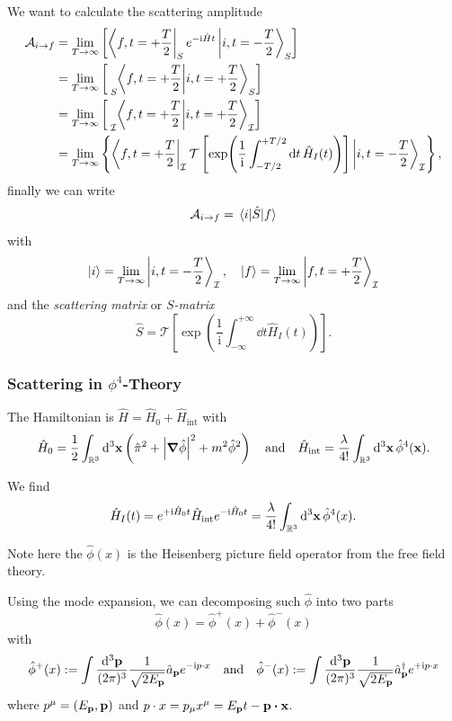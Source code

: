 \documentclass[a4paper,11pt]{article}
\begin{document}
	We want to calculate the scattering amplitude
	\begin{align*}
		\mathcal{A}_{i \to f} & = \lim _{T \to \infty} \left[\bra{f, t = + \frac{T}{2}}_S e ^{-\mathrm{i}\hat H t} \ket{i, t = - \frac{T}{2}}_S \right]\\
		& = \lim _{T \to \infty} \left[\tensor[_S]{\braket{f, t = + \frac{T}{2}}{i, t = + \frac{T}{2}}}{_S}\right]\\
		& = \lim _{T \to \infty} \left[\tensor[_{\mathcal{I}}]{\braket{f, t = + \frac{T}{2}}{i, t = + \frac{T}{2}}}{_{\mathcal{I}}}\right]\\
		& = \lim _{T \to \infty} \left\{ \bra{f, t = + \frac{T}{2}}_{\mathcal{I}} \mathcal{T}\left[ \exp(\frac{1}{\mathrm{i}}\int_{- T/2}^{+T/2} \dd{t}\hat H_I(t)) \right] \ket{i, t = - \frac{T}{2}}_{\mathcal{I}} \right\},
	\end{align*}
	finally we can write
	\[
		\mathcal{A}_{i \to f} = \mel{i}{\hat S}{f}
	\]
	with
	\[
		\ket{i} = \lim _{T \to \infty} \ket{i, t = - \frac{T}{2}}_{\mathcal{I}}, \quad \ket{f} = \lim _{T \to \infty} \ket{f, t = + \frac{T}{2}}_{\mathcal{I}}
	\]
	and the \emph{scattering matrix} or \emph{$S$-matrix}
	\[
		\hat S = \mathcal{T} \left[ \exp(\frac{1}{\mathrm{i}}\int_{-\infty}^{+\infty}\dd{t}\hat H_I(t)) \right].
	\]
	 
	\subsubsection{Scattering in $\phi^4$-Theory}
	
	The Hamiltonian is $\hat H = \hat H_0 + \hat H _{\text{int}}$ with
	\[
		\hat H_0 = \frac{1}{2}\int _{\mathbb{R}^3} \dd[3]{\vb x} \left( \hat \pi^2 + \abs{\grad \hat \phi}^2 + m^2 \hat \phi^2 \right) \quad \text{and} \quad \hat H _{\text{int}} = \frac{\lambda}{4!} \int _{\mathbb{R}^3} \dd[3]{\vb x} \hat \phi^4(\vb x).
	\]
	
	We find 
	\begin{equation}
		\hat H_I(t) = e ^{+ \mathrm{i}\hat H_0 t} \hat H _{\text{int}} e ^{- \mathrm{i} \hat H_0 t} = \frac{\lambda}{4!} \int _{\mathbb{R}^3} \dd[3]{\vb x} \hat \phi^4(x).
		\label{eq:3.2.1}
	\end{equation}
	
	Note here the $\hat \phi(x)$ is the Heisenberg picture field operator from the free field theory.
	
	Using the mode expansion, we can decomposing such $\hat\phi$ into two parts
	\[
		\hat \phi(x) = \hat \phi^+(x) + \hat \phi^-(x)
	\]
	with
	\[
		\hat \phi^+(x) := \int \frac{\dd[3]{\vb p}}{(2\pi)^{3}} \frac{1}{\sqrt{2E _{\vb p}}} \hat a _{\vb p} e ^{- \mathrm{i} p \cdot x} \quad \text{and} \quad \hat \phi^-(x) := \int \frac{\dd[3]{\vb p}}{(2\pi)^{3}} \frac{1}{\sqrt{2E _{\vb p}}} \hat a^{\dagger} _{\vb p} e ^{+ \mathrm{i} p \cdot x}
	\]
	where $p^\mu = (E _{\vb p}, \vb p)$ and $p \cdot x = p_\mu x^\mu = E _{\vb p}t - \vb p \vdot \vb x$.
	
\end{document}

